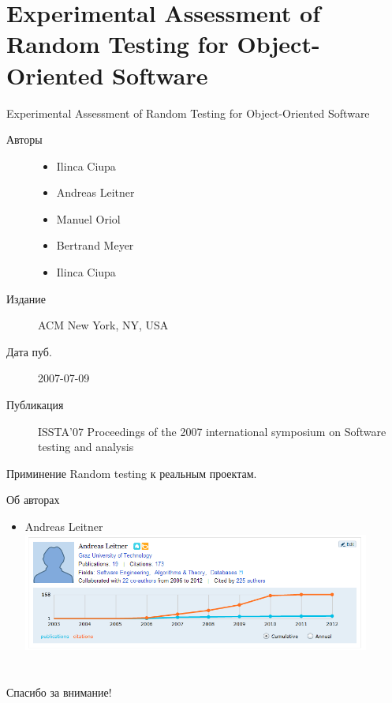 \documentclass[11pt,pdf,hyperref=unicode,hyperref={bookmarks=false}]{beamer}
\begin{document}
    \section{Experimental Assessment of Random Testing for Object-Oriented Software}
        \begin{frame}{Experimental Assessment of Random Testing for Object-Oriented Software}
            \begin{description}
                \item[Авторы] \begin{itemize} \item Ilinca Ciupa\item Andreas Leitner\item Manuel Oriol\item Bertrand Meyer\item Ilinca Ciupa \end{itemize}
                \item[Издание] ACM New York, NY, USA 
                \item[Дата пуб.] 2007-07-09
                \item[Публикация] ISSTA'07 Proceedings of the 2007 international symposium on Software testing and analysis
            \end{description}
Приминение Random testing к реальным проектам.
        \end{frame}
        \begin{frame}{Об авторах}
            \begin{itemize}
                \item Andreas Leitner\\ 
                        \includegraphics[keepaspectratio=true,width=0.9\textwidth,height=\textheight]{leitner.png}\\
            \end{itemize}
        \end{frame}
\section{}
\begin{frame}
    \begin{center}
        {\Large Спасибо за внимание!}
    \end{center}
\end{frame}
\end{document}
